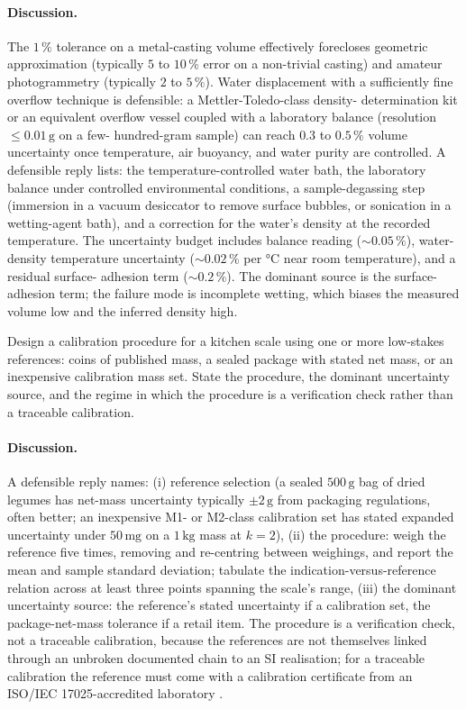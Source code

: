 \paragraph{Discussion.}
The $1\,\%$ tolerance on a metal-casting volume effectively
forecloses geometric approximation (typically $5$ to $10\,\%$ error
on a non-trivial casting) and amateur photogrammetry (typically
$2$ to $5\,\%$). Water displacement with a sufficiently fine
overflow technique is defensible: a Mettler-Toledo-class density-
determination kit or an equivalent overflow vessel coupled with a
laboratory balance (resolution $\leq 0.01 \,\si{\gram}$ on a few-
hundred-gram sample) can reach $0.3$ to $0.5\,\%$ volume uncertainty
once temperature, air buoyancy, and water purity are controlled. A
defensible reply lists: the temperature-controlled water bath, the
laboratory balance under controlled environmental conditions, a
sample-degassing step (immersion in a vacuum desiccator to remove
surface bubbles, or sonication in a wetting-agent bath), and a
correction for the water's density at the recorded temperature. The
uncertainty budget includes balance reading ($\sim 0.05\,\%$),
water-density temperature uncertainty ($\sim 0.02\,\%$ per $\si
{\degreeCelsius}$ near room temperature), and a residual surface-
adhesion term ($\sim 0.2\,\%$). The dominant source is the
surface-adhesion term; the failure mode is incomplete wetting,
which biases the measured volume low and the inferred density high.

\begin{exercise}
Design a calibration procedure for a kitchen scale using one or more
low-stakes references: coins of published mass, a sealed package
with stated net mass, or an inexpensive calibration mass set. State
the procedure, the dominant uncertainty source, and the regime in
which the procedure is a verification check rather than a traceable
calibration.
\end{exercise}

\paragraph{Discussion.}
A defensible reply names: (i) reference selection (a sealed
$500 \,\si{\gram}$ bag of dried legumes has net-mass uncertainty
typically $\pm 2 \,\si{\gram}$ from packaging regulations, often
better; an inexpensive M1- or M2-class calibration set has stated
expanded uncertainty under $50 \,\si{\milli\gram}$ on a $1 \,\si
{\kilogram}$ mass at $k = 2$), (ii) the procedure: weigh the
reference five times, removing and re-centring between weighings,
and report the mean and sample standard deviation; tabulate the
indication-versus-reference relation across at least three points
spanning the scale's range, (iii) the dominant uncertainty source:
the reference's stated uncertainty if a calibration set, the
package-net-mass tolerance if a retail item. The procedure is a
verification check, not a traceable calibration, because the
references are not themselves linked through an unbroken
documented chain to an SI realisation; for a traceable calibration
the reference must come with a calibration certificate from an
ISO/IEC 17025-accredited laboratory \cite{std:iso-iec-17025}.

